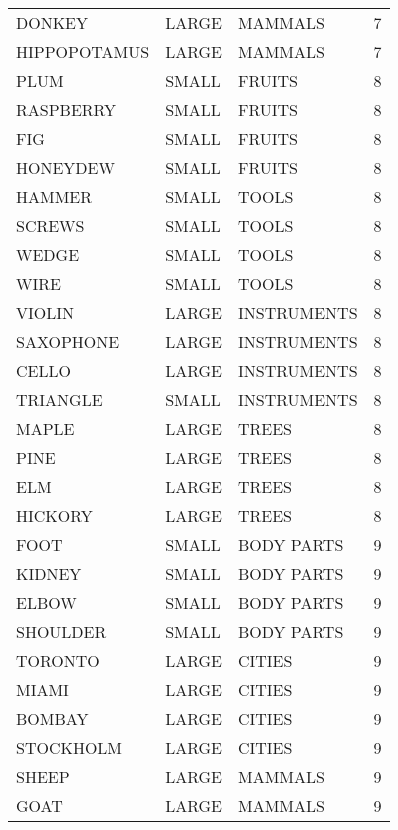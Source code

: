 \begin{tabular}{lllr}
      DONKEY & LARGE &          MAMMALS &        7 \\
HIPPOPOTAMUS & LARGE &          MAMMALS &        7 \\
        PLUM & SMALL &           FRUITS &        8 \\
   RASPBERRY & SMALL &           FRUITS &        8 \\
         FIG & SMALL &           FRUITS &        8 \\
    HONEYDEW & SMALL &           FRUITS &        8 \\
      HAMMER & SMALL &            TOOLS &        8 \\
      SCREWS & SMALL &            TOOLS &        8 \\
       WEDGE & SMALL &            TOOLS &        8 \\
        WIRE & SMALL &            TOOLS &        8 \\
      VIOLIN & LARGE &      INSTRUMENTS &        8 \\
   SAXOPHONE & LARGE &      INSTRUMENTS &        8 \\
       CELLO & LARGE &      INSTRUMENTS &        8 \\
    TRIANGLE & SMALL &      INSTRUMENTS &        8 \\
       MAPLE & LARGE &            TREES &        8 \\
        PINE & LARGE &            TREES &        8 \\
         ELM & LARGE &            TREES &        8 \\
     HICKORY & LARGE &            TREES &        8 \\
        FOOT & SMALL &       BODY PARTS &        9 \\
      KIDNEY & SMALL &       BODY PARTS &        9 \\
       ELBOW & SMALL &       BODY PARTS &        9 \\
    SHOULDER & SMALL &       BODY PARTS &        9 \\
     TORONTO & LARGE &           CITIES &        9 \\
       MIAMI & LARGE &           CITIES &        9 \\
      BOMBAY & LARGE &           CITIES &        9 \\
   STOCKHOLM & LARGE &           CITIES &        9 \\
       SHEEP & LARGE &          MAMMALS &        9 \\
        GOAT & LARGE &          MAMMALS &        9 \\

\end{tabular}

